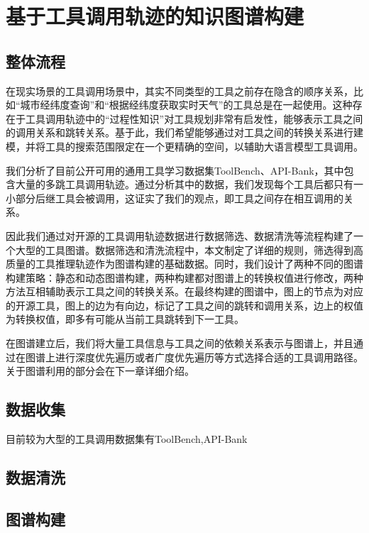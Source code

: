 
\chapter{基于工具调用轨迹的知识图谱构建}

\section{整体流程}

在现实场景的工具调用场景中，其实不同类型的工具之前存在隐含的顺序关系，比如“城市经纬度查询”和“根据经纬度获取实时天气”的工具总是在一起使用。这种存在于工具调用轨迹中的“过程性知识”对工具规划非常有启发性，能够表示工具之间的调用关系和跳转关系。基于此，我们希望能够通过对工具之间的转换关系进行建模，并将工具的搜索范围限定在一个更精确的空间，以辅助大语言模型工具调用。

我们分析了目前公开可用的通用工具学习数据集ToolBench、API-Bank，其中包含大量的多跳工具调用轨迹。通过分析其中的数据，我们发现每个工具后都只有一小部分后继工具会被调用，这证实了我们的观点，即工具之间存在相互调用的关系。

因此我们通过对开源的工具调用轨迹数据进行数据筛选、数据清洗等流程构建了一个大型的工具图谱。数据筛选和清洗流程中，本文制定了详细的规则，筛选得到高质量的工具推理轨迹作为图谱构建的基础数据。同时，我们设计了两种不同的图谱构建策略：静态和动态图谱构建，两种构建都对图谱上的转换权值进行修改，两种方法互相辅助表示工具之间的转换关系。在最终构建的图谱中，图上的节点为对应的开源工具，图上的边为有向边，标记了工具之间的跳转和调用关系，边上的权值为转换权值，即多有可能从当前工具跳转到下一工具。

在图谱建立后，我们将大量工具信息与工具之间的依赖关系表示与图谱上，并且通过在图谱上进行深度优先遍历或者广度优先遍历等方式选择合适的工具调用路径。关于图谱利用的部分会在下一章详细介绍。

\section{数据收集}

目前较为大型的工具调用数据集有ToolBench\cite{Qin2023},API-Bank\cite{Li2023}

\section{数据清洗}

\section{图谱构建}

